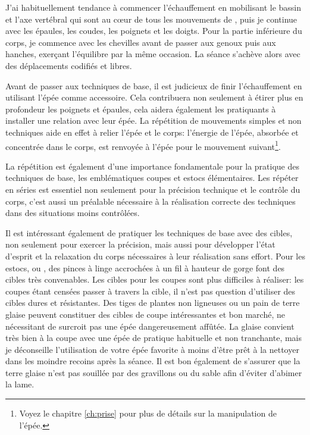 J'ai habituellement tendance à commencer l'échauffement en mobilisant le bassin et l'axe vertébral qui sont au c\oe{}ur de tous les mouvements de \Taiji{}, puis je continue avec les épaules, les coudes, les poignets et les doigts.
Pour la partie inférieure du corps, je commence avec les chevilles avant de passer aux genoux puis aux hanches, exerçant l'équilibre par la même occasion.
La séance s'achève alors avec des déplacements codifiés et libres.

Avant de passer aux techniques de base, il est judicieux de finir l'échauffement en utilisant l'épée comme accessoire. Cela contribuera non seulement à étirer plus en profondeur les poignets et épaules, cela aidera également les pratiquants à installer une relation avec leur épée.
La répétition de mouvements simples et non techniques aide en effet à relier l'épée et le corps: l'énergie de l'épée, absorbée et concentrée dans le corps, est renvoyée à l'épée pour le mouvement suivant\footnote{Voyez le chapitre \ref*{ch:prise} pour plus de détails sur la manipulation de l'épée.}.

La répétition est également d'une importance fondamentale pour la pratique des techniques de base, les emblématiques coupes et estocs élémentaires. Les répéter en séries est essentiel non seulement pour la précision technique et le contrôle du corps, c'est aussi un préalable nécessaire à la réalisation correcte des techniques  dans des situations moins contrôlées.

Il est intéressant également de pratiquer les techniques de base avec des cibles, non seulement pour exercer la précision, mais aussi pour développer l'état d'esprit et la relaxation du corps nécessaires à leur réalisation sans effort.
Pour les estocs, \Ci{} ou \Zha{}, des pinces à linge accrochées à un fil à hauteur de gorge font des cibles très convenables.
Les cibles pour les coupes sont plus difficiles à réaliser: les coupes étant censées passer à travers la cible, il n'est pas question d'utiliser des cibles dures et résistantes. Des tiges de plantes non ligneuses ou un pain de terre glaise peuvent constituer des cibles de coupe intéressantes et bon marché, ne nécessitant de surcroit pas une épée dangereusement affûtée.
La glaise convient très bien à la coupe avec une épée de pratique habituelle et non tranchante, mais je déconseille l'utilisation de votre épée favorite à moins d'être prêt à la nettoyer dans les moindre recoins après la séance.
Il est bon également de s'assurer que la terre glaise n'est pas souillée par des gravillons ou du sable afin d'éviter d'abimer la lame. 

